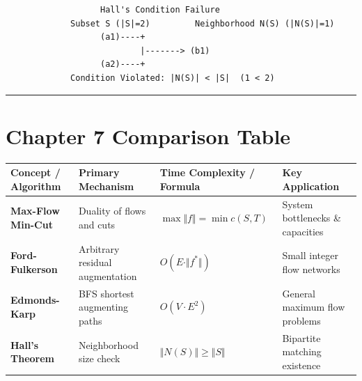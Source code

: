 \documentclass[
]{book}
\newcounter{none} %
\theoremstyle{definition}
\theoremstyle{definition}
\theoremstyle{definition}
\theoremstyle{definition}
\theoremstyle{remark}
\begin{document}
\begin{verbatim}
                   Hall's Condition Failure
             Subset S (|S|=2)         Neighborhood N(S) (|N(S)|=1)
                   (a1)----+
                           |-------> (b1)
                   (a2)----+
             Condition Violated: |N(S)| < |S|  (1 < 2)
\end{verbatim}

\begin{center}\rule{0.5\linewidth}{0.5pt}\end{center}

\section{Chapter 7 Comparison Table}\label{chapter-7-comparison-table}

{\def\LTcaptype{none} %
\begin{longtable}[]{@{}
  >{\raggedright\arraybackslash}p{}
  >{\raggedright\arraybackslash}p{}
  >{\raggedright\arraybackslash}p{}
  >{\raggedright\arraybackslash}p{}@{}}
\toprule\noalign{}
\begin{minipage}[b]{\linewidth}\raggedright
Concept / Algorithm
\end{minipage} & \begin{minipage}[b]{\linewidth}\raggedright
Primary Mechanism
\end{minipage} & \begin{minipage}[b]{\linewidth}\raggedright
Time Complexity / Formula
\end{minipage} & \begin{minipage}[b]{\linewidth}\raggedright
Key Application
\end{minipage} \\
\midrule\noalign{}
\endhead
\bottomrule\noalign{}
\endlastfoot
\textbf{Max-Flow Min-Cut} & Duality of flows and cuts & \(\max \Vert{}f\Vert{} = \min c(S, T)\) & System bottlenecks \& capacities \\
\textbf{Ford-Fulkerson} & Arbitrary residual augmentation & \(O(E \cdot \Vert{}f^*\Vert{})\) & Small integer flow networks \\
\textbf{Edmonds-Karp} & BFS shortest augmenting paths & \(O(V \cdot E^2)\) & General maximum flow problems \\
\textbf{Hall's Theorem} & Neighborhood size check & \(\Vert{}N(S)\Vert{} \ge \Vert{}S\Vert{}\) & Bipartite matching existence \\
\end{longtable}
}
\end{document}
